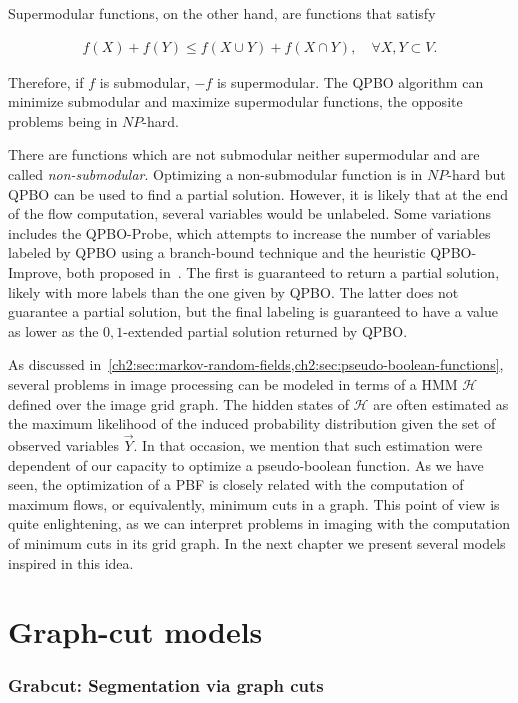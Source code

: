 Supermodular functions, on the other hand, are functions that satisfy

\begin{align*}
	f(X) + f(Y) \leq f(X \cup Y) + f(X \cap Y),\quad \forall X,Y \subset V.
\end{align*}

Therefore, if $f$ is submodular, $-f$ is supermodular. The QPBO algorithm can minimize submodular and maximize supermodular functions, the opposite problems being in $NP$-hard. 

There are functions which are not submodular neither supermodular and are called \emph{non-submodular}. Optimizing a non-submodular function is in $NP$-hard but QPBO can be used to find a partial solution. However, it is likely that at the end of the flow computation, several variables would be unlabeled. Some variations includes the QPBO-Probe, which attempts to increase the number of variables labeled by QPBO using a branch-bound technique and the heuristic QPBO-Improve, both proposed in~\cite{rother07qpbo}. The first is guaranteed to return a partial solution, likely with more labels than the one given by QPBO. The latter does not guarantee a partial solution, but the final labeling is guaranteed to have a value as lower as the $0,1$-extended partial solution returned by QPBO.

As discussed in~\cref{ch2:sec:markov-random-fields,ch2:sec:pseudo-boolean-functions}, several problems in image processing can be modeled in terms of a HMM $\mathcal{H}$ defined over the image grid graph. The hidden states of $\mathcal{H}$ are often estimated as the maximum likelihood of the induced probability distribution given the set of observed variables $\vec{Y}$. In that occasion, we mention that such estimation were dependent of our capacity to optimize a pseudo-boolean function. As we have seen, the optimization of a PBF is closely related with the computation of maximum flows, or equivalently, minimum cuts in a graph. This point of view is quite enlightening, as we can interpret problems in imaging with the computation of minimum cuts in its grid graph. In the next chapter we present several models inspired in this idea.



\section{Graph-cut models}
\label{ch2:sec:graph-cut-models}

\subsubsection{Grabcut: Segmentation via graph cuts}

